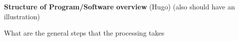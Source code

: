 \textbf{Structure of Program/Software overview} (Hugo) (also should have an illustration)

What are the general steps that the processing takes
    